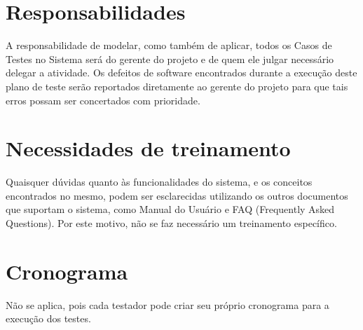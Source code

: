 \section{Responsabilidades}

A responsabilidade de modelar, como também de aplicar, todos os Casos de Testes no Sistema será do gerente do projeto e de quem ele julgar necessário delegar a atividade.
Os defeitos de software encontrados durante a execução deste plano de teste serão reportados diretamente ao gerente do projeto para que tais erros possam ser concertados com prioridade.

\section{Necessidades de treinamento}

Quaisquer dúvidas quanto às funcionalidades do sistema, e os conceitos encontrados no mesmo, podem ser esclarecidas utilizando os outros documentos que suportam o sistema, como Manual do Usuário e FAQ (Frequently Asked Questions). Por este motivo, não se faz necessário um treinamento específico.

\section{Cronograma}

Não se aplica, pois cada testador pode criar seu próprio cronograma para a execução dos testes. 